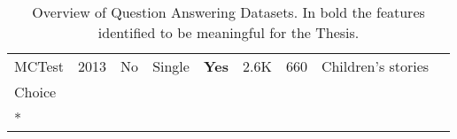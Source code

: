 \begin{landscape}
\begin{longtable}[c]{@{}lccccllll@{}}
MCTest                                                                        & 2013                                                    & No                                                          & Single         & \textbf{Yes}                                           & 2.6K    & 660                                                   & Children’s stories                                                                                                                                & \begin{tabular}[c]{@{}l@{}}Multiple \\ Choice\end{tabular}     \\* \bottomrule
\caption{Overview of Question Answering Datasets. In bold the features identified to be meaningful for the Thesis.}
\label{tab:qa_overview_datasets}\\
\end{longtable}
\end{landscape}


